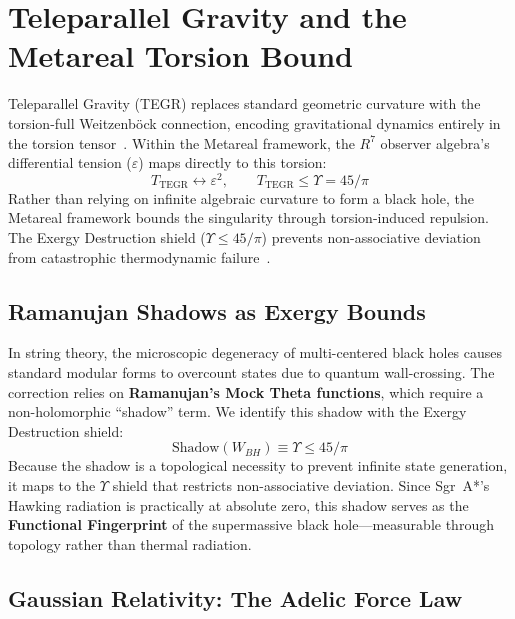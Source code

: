 \section{Teleparallel Gravity and the Metareal Torsion Bound}

Teleparallel Gravity (TEGR) replaces standard geometric curvature with the torsion-full Weitzenb\"{o}ck connection, encoding gravitational dynamics entirely in the torsion tensor~\cite{maluf2013, bahamonde2023}. Within the Metareal framework, the $R^7$ observer algebra's differential tension ($\varepsilon$) maps directly to this torsion:
\begin{equation}
    T_{\text{TEGR}} \longleftrightarrow \varepsilon^2, \qquad T_{\text{TEGR}} \leq \Upsilon = 45/\pi
\end{equation}
Rather than relying on infinite algebraic curvature to form a black hole, the Metareal framework bounds the singularity through torsion-induced repulsion. The Exergy Destruction shield ($\Upsilon \leq 45/\pi$) prevents non-associative deviation from catastrophic thermodynamic failure~\cite{layden2025}.

\subsection{Ramanujan Shadows as Exergy Bounds}

In string theory, the microscopic degeneracy of multi-centered black holes causes standard modular forms to overcount states due to quantum wall-crossing. The correction relies on \textbf{Ramanujan's Mock Theta functions}, which require a non-holomorphic ``shadow'' term. We identify this shadow with the Exergy Destruction shield:
\begin{equation}
    \text{Shadow}(W_{BH}) \equiv \Upsilon \leq 45/\pi
\end{equation}
Because the shadow is a topological necessity to prevent infinite state generation, it maps to the $\Upsilon$ shield that restricts non-associative deviation. Since Sgr~A*'s Hawking radiation is practically at absolute zero, this shadow serves as the \textbf{Functional Fingerprint} of the supermassive black hole---measurable through topology rather than thermal radiation.

\subsection{Gaussian Relativity: The Adelic Force Law}
\label{sec:gaussian_relativity}


